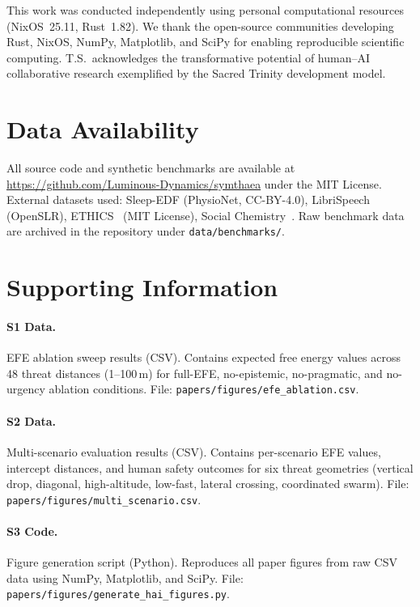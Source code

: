 \documentclass[10pt,letterpaper]{article}
\begin{document}
This work was conducted independently using personal computational resources
(NixOS~25.11, Rust~1.82). We thank the open-source communities developing
Rust, NixOS, NumPy, Matplotlib, and SciPy for enabling reproducible scientific
computing. T.S.\ acknowledges the transformative potential of human--AI
collaborative research exemplified by the Sacred Trinity development model.

\section*{Data Availability}

All source code and synthetic benchmarks are available at
\url{https://github.com/Luminous-Dynamics/symthaea} under the MIT License.
External datasets used: Sleep-EDF (PhysioNet, CC-BY-4.0), LibriSpeech
(OpenSLR), ETHICS~\cite{hendrycks2021aligning} (MIT License), Social
Chemistry~\cite{forbes2020social}. Raw benchmark data are archived in the
repository under \texttt{data/benchmarks/}.

\section*{Supporting Information}

\paragraph*{S1 Data.}
\label{s1-data}
{EFE ablation sweep results (CSV). Contains expected free energy values across
48 threat distances (1--100\,m) for full-EFE, no-epistemic, no-pragmatic, and
no-urgency ablation conditions. File:
\texttt{papers/figures/efe\_ablation.csv}.}

\paragraph*{S2 Data.}
\label{s2-data}
{Multi-scenario evaluation results (CSV). Contains per-scenario EFE values,
intercept distances, and human safety outcomes for six threat geometries
(vertical drop, diagonal, high-altitude, low-fast, lateral crossing,
coordinated swarm). File: \texttt{papers/figures/multi\_scenario.csv}.}

\paragraph*{S3 Code.}
\label{s3-code}
{Figure generation script (Python). Reproduces all paper figures from raw CSV
data using NumPy, Matplotlib, and SciPy. File:
\texttt{papers/figures/generate\_hai\_figures.py}.}
\end{document}
